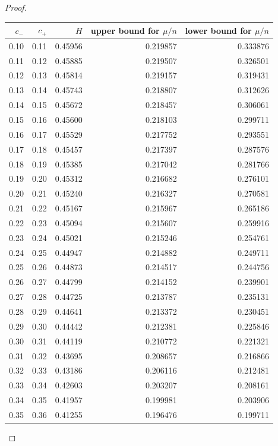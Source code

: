 \documentclass[11pt,a4paper]{article}
\theoremstyle{remark}
\numberwithin{equation}{section}
\begin{document}
\begin{proof}
\begin{longtable}{rrrrr}
\toprule
$c_-$ & $c_+$ & $H$ & upper bound for $\mu/n$ & lower bound for $\mu/n$\\
\midrule\endhead
0.10 & 0.11 & 0.45956 & 0.219857 & 0.333876\\
0.11 & 0.12 & 0.45885 & 0.219507 & 0.326501\\
0.12 & 0.13 & 0.45814 & 0.219157 & 0.319431\\
0.13 & 0.14 & 0.45743 & 0.218807 & 0.312626\\
0.14 & 0.15 & 0.45672 & 0.218457 & 0.306061\\
0.15 & 0.16 & 0.45600 & 0.218103 & 0.299711\\
0.16 & 0.17 & 0.45529 & 0.217752 & 0.293551\\
0.17 & 0.18 & 0.45457 & 0.217397 & 0.287576\\
0.18 & 0.19 & 0.45385 & 0.217042 & 0.281766\\
0.19 & 0.20 & 0.45312 & 0.216682 & 0.276101\\
0.20 & 0.21 & 0.45240 & 0.216327 & 0.270581\\
0.21 & 0.22 & 0.45167 & 0.215967 & 0.265186\\
0.22 & 0.23 & 0.45094 & 0.215607 & 0.259916\\
0.23 & 0.24 & 0.45021 & 0.215246 & 0.254761\\
0.24 & 0.25 & 0.44947 & 0.214882 & 0.249711\\
0.25 & 0.26 & 0.44873 & 0.214517 & 0.244756\\
0.26 & 0.27 & 0.44799 & 0.214152 & 0.239901\\
0.27 & 0.28 & 0.44725 & 0.213787 & 0.235131\\
0.28 & 0.29 & 0.44641 & 0.213372 & 0.230451\\
0.29 & 0.30 & 0.44442 & 0.212381 & 0.225846\\
0.30 & 0.31 & 0.44119 & 0.210772 & 0.221321\\
0.31 & 0.32 & 0.43695 & 0.208657 & 0.216866\\
0.32 & 0.33 & 0.43186 & 0.206116 & 0.212481\\
0.33 & 0.34 & 0.42603 & 0.203207 & 0.208161\\
0.34 & 0.35 & 0.41957 & 0.199981 & 0.203906\\
0.35 & 0.36 & 0.41255 & 0.196476 & 0.199711\\

\end{longtable}
\end{proof}
\end{document}
